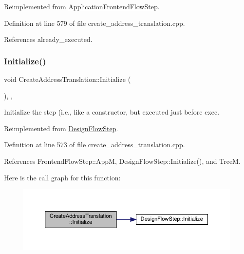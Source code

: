 Reimplemented from \hyperlink{classApplicationFrontendFlowStep_ad99f4dcbab470c65eea79ae0291a4bd5}{Application\+Frontend\+Flow\+Step}.



Definition at line 579 of file create\+\_\+address\+\_\+translation.\+cpp.



References already\+\_\+executed.

\mbox{\label{classCreateAddressTranslation_a869c3993736729eb7be9b70c1b920255}} 
\subsubsection{\texorpdfstring{Initialize()}{Initialize()}}
{\footnotesize\ttfamily void Create\+Address\+Translation\+::\+Initialize (\begin{DoxyParamCaption}{ }\end{DoxyParamCaption})\hspace{0.3cm}{\ttfamily [override]}, {\ttfamily [protected]}, {\ttfamily [virtual]}}



Initialize the step (i.\+e., like a constructor, but executed just before exec. 



Reimplemented from \hyperlink{classDesignFlowStep_a44b50683382a094976e1d432a7784799}{Design\+Flow\+Step}.



Definition at line 573 of file create\+\_\+address\+\_\+translation.\+cpp.



References Frontend\+Flow\+Step\+::\+AppM, Design\+Flow\+Step\+::\+Initialize(), and TreeM.

Here is the call graph for this function\+:
\nopagebreak
\begin{figure}[H]
\begin{center}
\leavevmode
\includegraphics[width=350pt]{d1/d40/classCreateAddressTranslation_a869c3993736729eb7be9b70c1b920255_cgraph}
\end{center}
\end{figure}


